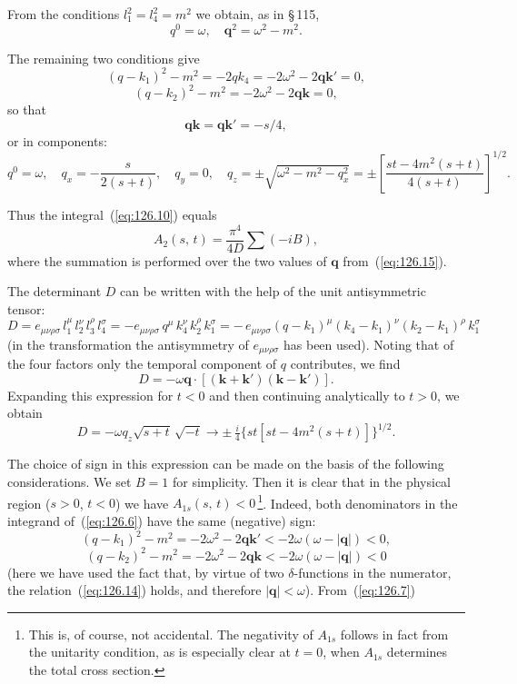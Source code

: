 From the conditions $l_1^2 = l_4^2 = m^2$ we obtain, as in \S\,115,
\begin{equation}
q^0 = \omega,\quad \mathbf{q}^2 = \omega^2 - m^2.
\label{eq:126.14}
\end{equation}


The remaining two conditions give
\[
(q - k_1)^2 - m^2 = -2qk_4 = -2\omega^2 - 2\mathbf{q}\mathbf{k}' = 0,
\]
\[
(q - k_2)^2 - m^2 = -2\omega^2 - 2\mathbf{q}\mathbf{k} = 0,
\]
so that
\[
\mathbf{q}\mathbf{k} = \mathbf{q}\mathbf{k}' = -s/4,
\]
or in components:
\begin{equation}
q^0 = \omega,\quad q_x = -\frac{s}{2(s+t)},\quad q_y = 0,\quad q_z = \pm\sqrt{\omega^2 - m^2 - q_x^2} = \pm\left[\frac{st - 4m^2(s+t)}{4(s+t)}\right]^{1/2}.
\label{eq:126.15}
\end{equation}

Thus the integral~(\ref{eq:126.10}) equals
\begin{equation}
A_2(s,\,t) = \frac{\pi^4}{4D}\sum(-iB),
\label{eq:126.16}
\end{equation}
where the summation is performed over the two values of $\mathbf{q}$ from~(\ref{eq:126.15}).

The determinant $D$ can be written with the help of the unit antisymmetric tensor:
\[
D = e_{\mu\nu\rho\sigma}\,l_1^\mu\,l_2^\nu\,l_3^\rho\,l_4^\sigma = -e_{\mu\nu\rho\sigma}\,q^\mu\,k_4^\nu\,k_2^\rho\,k_1^\sigma = -\,e_{\mu\nu\rho\sigma}(q-k_1)^\mu(k_4-k_1)^\nu(k_2-k_1)^\rho\,k_1^\sigma
\]
(in the transformation the antisymmetry of $e_{\mu\nu\rho\sigma}$ has been used). Noting that of the four factors only the temporal component of $q$ contributes, we find
\[
D = -\omega\mathbf{q}\cdot[(\mathbf{k}+\mathbf{k}')(\mathbf{k}-\mathbf{k}')].
\]
Expanding this expression for $t < 0$ and then continuing analytically to $t > 0$, we obtain
\begin{equation}
D = -\omega q_z\sqrt{s+t}\,\sqrt{-t} \to \pm\,\tfrac{i}{4}\{st[st - 4m^2(s+t)]\}^{1/2}.
\label{eq:126.17}
\end{equation}

The choice of sign in this expression can be made on the basis of the following considerations. We set $B = 1$ for simplicity. Then it is clear that in the physical region ($s > 0$, $t < 0$) we have $A_{1s}(s,\,t) < 0$\,\footnote{This is, of course, not accidental. The negativity of $A_{1s}$ follows in fact from the unitarity condition, as is especially clear at $t = 0$, when $A_{1s}$ determines the total cross section.}. Indeed, both denominators in the integrand of~(\ref{eq:126.6}) have the same (negative) sign:
\[
(q - k_1)^2 - m^2 = -2\omega^2 - 2\mathbf{q}\mathbf{k}' < -2\omega(\omega - |\mathbf{q}|) < 0,
\]
\[
(q - k_2)^2 - m^2 = -2\omega^2 - 2\mathbf{q}\mathbf{k} < -2\omega(\omega - |\mathbf{q}|) < 0
\]
(here we have used the fact that, by virtue of two $\delta$-functions in the numerator, the relation~(\ref{eq:126.14}) holds, and therefore $|\mathbf{q}| < \omega$). From~(\ref{eq:126.7})


